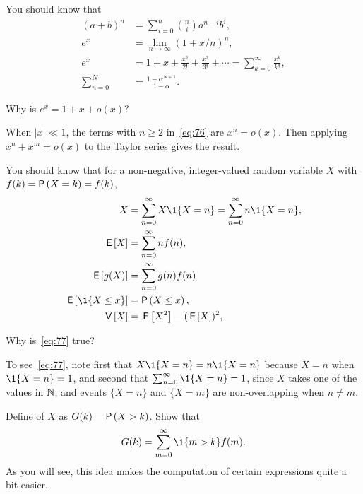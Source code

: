 You should know that
\begin{subequations}
  \begin{align}
    (a+b)^n &= \sum_{i=0}^n {n \choose i} a^{n-i} b^i, \label{eq:71}\\
e^x &= \lim_{n\to\infty} (1+x/n)^n, \label{eq:65}\\
    e^x &= 1 + x + \frac{x^2}{2!} + \frac{x^3}{3!} + \cdots = \sum_{k=0}^{\infty} \frac{x^k}{k!}, \label{eq:76}\\
    \sum_{n=0}^N &= \frac{1-\alpha^{N+1}}{1-\alpha}. \label{eq:61}
\end{align}
\end{subequations}

\begin{exercise}%
  Why is $e^{x} = 1 +x + o(x)$?
  \begin{solution}
    When $|x|\ll 1$, the  terms with $n\geq 2$ in~\eqref{eq:76} are $x^n = o(x)$. Then applying $x^n + x^m = o(x)$ to the Taylor series gives the result.
  \end{solution}
\end{exercise}


You should know that for a non-negative, integer-valued random variable $X$ with   $f(k)= \P{X = k} = f(k)$, 
\begin{subequations}
\begin{align}
X&=\sum_{n=0}^\infty X\1{X=n} = \sum_{n=0}^\infty n \1{X=n},   \label{eq:77} \\
\E X &= \sum_{n=0}^\infty n f(n), \\
\E{g(X)} &= \sum_{n=0}^\infty g(n) f(n)  \label{eq:66}\\
\E{\1{X\leq x}} &= \P{X\leq x}, \label{eq:74}\\
\V X &= \E{X^2} - (\E X)^2,\label{eq:68}
\end{align}
\end{subequations}

\begin{exercise}%
  Why is~\eqref{eq:77} true?
  \begin{solution}
To see~\eqref{eq:77}, note first that $X\1{X=n} = n\1{X=n}$ because $X=n$ when $\1{X=n} =1$, and second that $\sum_{n=0}^\infty \1{X=n} =1$, since $X$ takes one of the values in $\mathbb{N}$, and events $\{X=n\}$ and $\{X=m\}$ are non-overlapping when $n\neq m$. 
  \end{solution}
\end{exercise}

\begin{exercise}%
Define   of $X$ as $G(k) = \P{X>k}$. Show that
\begin{equation*}
  G(k) = \sum_{m=0}^\infty \1{m>k} f(m).
\end{equation*}
As you will see, this idea  makes the computation of certain expressions quite a bit easier. 
\end{exercise}

